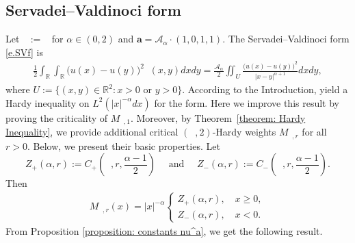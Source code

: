 \documentclass[12pt, a4paper]{amsart}
\DeclareMathOperator{\Masss}{\nu_{\alpha}^{(\boldsymbol{a})}}
\DeclareMathOperator{\mass}{\widetilde{\nu}_{\alpha}}
\newcommand{\R}{\mathbb{R}}
\begin{document}
\subsection{Servadei--Valdinoci form}\label{ss.SV}
Let $\mass := \Masss$ for $\alpha \in (0,2)$ and $\boldsymbol{a} = \mathcal{A}_\alpha\cdot (1,0,1,1)$. The Servadei--Valdinoci form \eqref{e.SVf}
is
\begin{align}\label{e.SVf2}
    \frac{1}{2} \int_{\R}\int_{\R} \bigl(u(x) - u(y)\bigr)^2 \mass(x,y)  dx  dy = \frac{\mathcal{A}_\alpha}{2} \iint_{U} \frac{\bigl(u(x) - u(y)\bigr)^2}{|x - y|^{\alpha+1}}  dx  dy,
\end{align}
where $U := {\{(x, y) \in \R^2: x > 0 \text{ or } y > 0\}}$.
According to the Introduction, 
\cite[Theorem 1.2.1, Proposition 5.3.7, and Proposition 5.3.9]{BogdanFafulaSztonyk2025} yield a Hardy inequality on $L^2(|x|^{-\alpha}dx)$ for the form. Here we improve this result by proving the criticality of $M_{\mass, 1}$. Moreover,  by Theorem~\ref{theorem: Hardy Inequality}, we provide additional critical $(\mass, 2)$-Hardy weights $M_{\mass, r}$ for all $r > 0$. Below, we present their basic properties. Let
 \begin{equation*}
    Z_{+}(\alpha, r) := C_{+}\left(\mass, r, \frac{\alpha - 1}{2}\right)
    \quad \mbox{ and } \quad
    Z_{-}(\alpha, r) := C_{-}\left(\mass, r, \frac{\alpha - 1}{2}\right).
\end{equation*}
Then 
\begin{align*}
    M_{\mass, r}(x) = |x|^{-\alpha}\begin{cases}
        Z_+(\alpha, r), \quad x \geq 0,
        \\
        Z_{-}(\alpha, r), \quad x < 0.
    \end{cases}
\end{align*}
From Proposition \cref{proposition: constants nu^a}, we get the following result.
\end{document}
